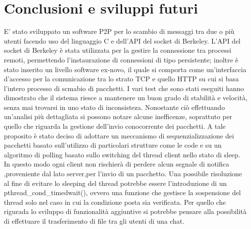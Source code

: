 \chapter{Conclusioni e sviluppi futuri}\label{conclusioni}
E' stato sviluppato un software P2P per lo scambio di messaggi tra due o più utenti facendo uso del
linguaggio C e dell'API del socket di Berkeley.
L'API del socket di Berkeley è stata utilizzata per la gestire la connessione tra processi remoti, permettendo 
l'instaurazione di connessioni di tipo persistente; inoltre è stato inserito un livello software ex-novo, il quale si comporta come un'interfaccia d'accesso per la comunicazione tra lo strato TCP e quello HTTP su cui si basa l'intero processo di scmabio di pacchetti.
I vari test che sono stati eseguiti hanno dimostrato che il sistema riesce a mantenere un buon grado di stabilità e velocità, senza mai trovarsi in uno stato di inconsisteza.
Nonostante ciò effettuando un'analisi più dettagliata si possono notare alcune inefficenze, soprattuto per quello che riguarda la gestione dell'invio conocorrente dei pacchetti. 
A tale proposito è stato deciso di adottare un meccanismo di sequenzializzazione dei pacchetti basato sull'utilizzo di particolari strutture come le code e su un algoritmo di polling basato sullo switching del thread client nello stato di sleep.
In questo modo ogni client non rischierà di perdere alcun segnale di notifica ,proveniente dal lato server,per l'invio di un pacchetto.
Una possibile risoluzione al fine di evitare lo sleeping del thread potrebbe essere l'introduzione di un pthread_cond_timedwait(), ovvero una funzione che gestisce la sospensione del thread solo nel caso in cui la condizione posta sia verificata.
Per quello che rigurada lo sviluppo di funzionalità aggiuntive si potrebbe pensare alla possibilità di effettuare il trasferimento di file tra gli utenti di una chat.   
